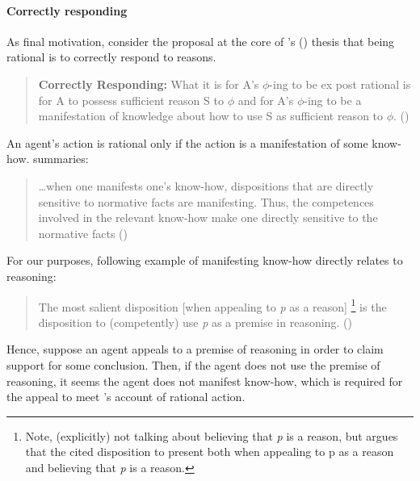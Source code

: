 \paragraph{Correctly responding}

\begin{note}
  As final motivation, consider the proposal at the core of \citeauthor{Lord:2018aa}'s (\Citeyear{Lord:2018aa}) thesis that being rational is to correctly respond to reasons.

  \begin{quote}
    \textbf{Correctly Responding:} What it is for A's \(\phi\)-ing to be ex post rational is for A to possess sufficient reason S to \(\phi\) and for A's \(\phi\)-ing to be a manifestation of knowledge about how to use S as sufficient reason to \(\phi\).\nolinebreak
    \mbox{}\hfill\mbox{(\Citeyear[143]{Lord:2018aa})}
  \end{quote}

  An agent's action is rational only if the action is a manifestation of some know-how.
  \citeauthor{Lord:2018aa} summaries:

  \begin{quote}
    \dots when one manifests one's know-how, dispositions that are directly sensitive to normative facts are manifesting. Thus, the competences involved in the relevant know-how make one directly sensitive to the normative facts\nolinebreak
    \mbox{}\hfill\mbox{(\Citeyear[16]{Lord:2018aa})}
  \end{quote}

  For our purposes, following example of manifesting know-how directly relates to reasoning:

  \begin{quote}
    The most salient disposition [when appealing to \emph{p} as a reason]\nolinebreak
    \footnote{Note, \citeauthor{Lord:2018aa} (explicitly) not talking about believing that \emph{p} is a reason, but argues that the cited disposition to present both when appealing to p as a reason and believing that \emph{p} is a reason.}
    is the disposition to (competently) use \emph{p} as a premise in reasoning.\nolinebreak
    \mbox{}\hfill\mbox{(\Citeyear[25]{Lord:2018aa})}
  \end{quote}

  Hence, suppose an agent appeals to a premise of reasoning in order to claim support for some conclusion.
  Then, if the agent does not use the premise of reasoning, it seems the agent does not manifest know-how, which is required for the appeal to meet \citeauthor{Lord:2018aa}'s account of rational action.


\end{note}
